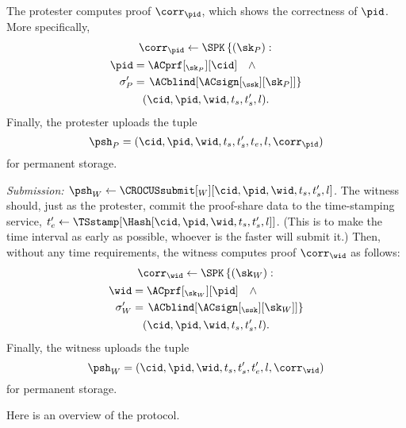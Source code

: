 The protester computes  proof \(\corr_{\pid}\), which shows the 
correctness of \(\pid\).
More specifically,
\begin{multline*}
  \corr_{\pid}\gets \SPK\left\{ (\sk_P) : \right. \\
    \begin{aligned}
      \pid &= \ACprf[_{\sk_P}][\cid] \quad \land \\
      \sigma_P' &= \left. \ACblind[\ACsign[_{\ssk}][\sk_P]] \right\}
    \end{aligned} \\
      (\cid, \pid, \wid, t_s, t_s', l).
\end{multline*}
Finally, the protester uploads the tuple \[
  \psh_P = (\cid, \pid, \wid, t_s, t_s', t_e, l, \corr_{\pid})
\] for permanent storage.

\emph{Submission: \(\psh_W\gets \CROCUSsubmit[_W][\cid, \pid, \wid, t_s, t_s', 
    l]\).}
The witness should, just as the protester, commit the proof-share data to the 
time-stamping service, \(t_e'\gets \TSstamp[\Hash[\cid, \pid, \wid, t_s, t_s', 
  l]]\).
(This is to make the time interval as early as possible, whoever is the faster 
will submit it.)
Then, without any time requirements, the witness computes  proof 
\(\corr_{\wid}\) as follows:
\begin{multline*}
  \corr_{\wid}\gets \SPK\left\{ (\sk_W) : \right. \\
    \begin{aligned}
      \wid &= \ACprf[_{\sk_W}][\pid] \quad \land \\
      \sigma_W' &= \left. \ACblind[\ACsign[_{\ssk}][\sk_W]] \right\}
    \end{aligned} \\
      (\cid, \pid, \wid, t_s, t_s', l).
\end{multline*}
Finally, the witness uploads the tuple \[
  \psh_W = (\cid, \pid, \wid, t_s, t_s', t_e', l, \corr_{\wid})
\] for permanent storage.


Here is an overview of the protocol.



